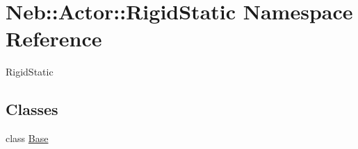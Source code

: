 \hypertarget{namespaceNeb_1_1Actor_1_1RigidStatic}{\section{\-Neb\-:\-:\-Actor\-:\-:\-Rigid\-Static \-Namespace \-Reference}
\label{namespaceNeb_1_1Actor_1_1RigidStatic}
}


\-Rigid\-Static  


\subsection*{\-Classes}
\begin{DoxyCompactItemize}
\item 
class \hyperlink{classNeb_1_1Actor_1_1RigidStatic_1_1Base}{\-Base}
\end{DoxyCompactItemize}
